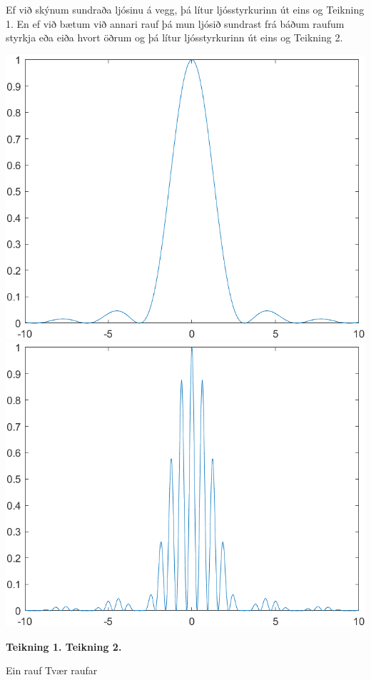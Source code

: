 \documentclass[12pt]{article}
\begin{document}
Ef við skýnum sundraða ljósinu á vegg, þá lítur ljósstyrkurinn út eins og Teikning 1. En ef við bætum við annari rauf þá mun ljósið sundrast frá báðum raufum styrkja eða eiða hvort öðrum og þá lítur ljósstyrkurinn út eins og Teikning 2. 

\begin{center}
    \includegraphics[scale=0.5]{html/teikning1.png}
    \includegraphics[scale=0.5]{html/teikning2.png}
    
    \bf Teikning 1.
    \qquad
    \qquad
    \qquad
    \qquad
    \bf Teikning 2.

    {\footnotesize Ein rauf}
    \qquad
    \qquad
    \qquad
    \qquad
    \quad
    {\footnotesize Tvær raufar}

\end{center}
\end{document}
